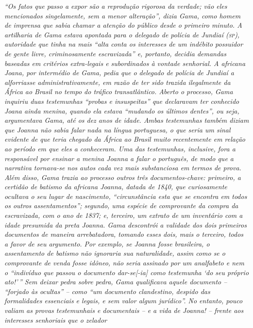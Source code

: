 {\begin{didascalia}
\emph{``Os fatos que passo a expor são a reprodução rigorosa da verdade;
vão eles mencionados singelamente, sem a menor alteração'', dizia Gama,
como homem de imprensa que sabia chamar a atenção do público desde o
primeiro minuto. A artilharia de Gama estava apontada para o delegado de
polícia de Jundiaí (\textsc{sp}), autoridade que tinha na mais ``alta conta os
interesses de um indébito possuidor de gente livre, criminosamente
escravizada'' e, portanto, decidia demandas baseadas em critérios
extra-legais e subordinados à vontade senhorial. A africana Joana, por
intermédio de Gama, pedia que o delegado de polícia de Jundiaí a
alforriasse administrativamente, em razão de ter sido trazida
ilegalmente da África ao Brasil no tempo do tráfico transatlântico.
Aberto o processo, Gama inquiriu duas testemunhas ``probas e insuspeitas''
que declaravam ter conhecido Joana ainda menina, quando ela estava
``mudando os últimos dentes'', ou seja, argumentava Gama, até os dez anos
de idade. Ambas testemunhas também diziam que Joanna não sabia falar
nada na língua portuguesa, o que seria um sinal evidente de que teria
chegado da África ao Brasil muito recentemente em relação ao período em
que eles a conheceram. Uma das testemunhas, inclusive, fora a
responsável por ensinar a menina Joanna a falar o português, de modo que
a narrativa tornava-se nos autos cada vez mais substanciosa em termos de
prova. Além disso, Gama trazia ao processo outros três documentos-chave:
primeiro, a certidão de batismo da africana Joanna, datada de 1840, que
curiosamente ocultava o seu lugar de nascimento, ``circunstância esta que
se encontra em todos os outros assentamentos''; segundo, uma espécie de
comprovante da compra da escravizada, com o ano de 1837; e, terceiro, um
extrato de um inventário com a idade presumida da preta Joanna. Gama
descontrói a validade dos dois primeiros documentos de maneira
arrebatadora, tomando esses dois, mais o terceiro, todos a favor de seu
argumento. Por exemplo, se Joanna fosse brasileira, o assentamento de
batismo não ignoraria sua naturalidade, assim como se o comprovante de
venda fosse idôneo, não seria assinado por um analfabeto e nem o
``indivíduo que passou o documento dar-se{[}-ia{]} como testemunha `do
seu próprio ato!'\,'' Sem deixar pedra sobre pedra, Gama qualificava aquele
documento -- ``forjado às ocultas'' -- como ``um documento clandestino,
despido das formalidades essenciais e legais, e sem valor algum
jurídico''. No entanto, pouco valiam as provas testemunhais e documentais
-- e a vida de Joanna! -- frente aos interesses senhoriais que o zelador
}
\end{didascalia}}
